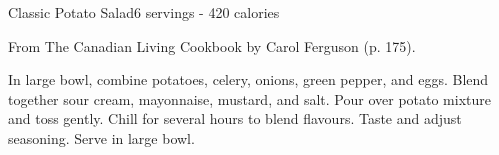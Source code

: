\begin{recipe}{Classic Potato Salad}{6 servings - 420 calories}{}

\freeform From {\normalfont The Canadian Living Cookbook} by Carol Ferguson (p. 175).


In large bowl, combine potatoes, celery, onions, green pepper, and eggs. Blend together sour cream, mayonnaise, mustard, and salt. Pour over potato mixture and toss gently. Chill for several hours to blend flavours. Taste and adjust seasoning. Serve in large bowl.

\end{recipe}